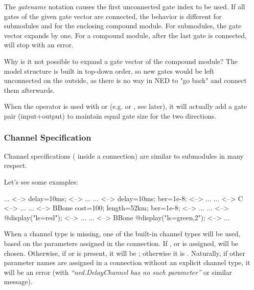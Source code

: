 The \textit{gatename}\ttt{++} notation causes the first unconnected gate index
to be used. If all gates of the given gate vector are connected, the behavior
is different for submodules and for the enclosing compound module.
For submodules, the gate vector expands by one. For a compound module,
after the last gate is connected, \ttt{++} will stop with an error.

\begin{note}
    Why is it not possible to expand a gate vector of the compound
    module? The model structure is built in top-down order, so new gates
    would be left unconnected on the outside, as there is no way in NED to
    "go back" and connect them afterwards.
\end{note}

When the \ttt{++} operator is used with  or 
(e.g.  or , see later), it will actually add
a gate pair (input+output) to maintain equal gate size for the two
directions.



\subsubsection{Channel Specification}

Channel specifications ( inside a connection)
are similar to submodules in many respect.

Let's see some examples:

\begin{ned}
... <--> {delay=10ms;} <--> ...
... <--> {delay=10ms; ber=1e-8;} <--> ...
... <--> C <--> ...
... <--> BBone {cost=100; length=52km; ber=1e-8;} <--> ...
... <--> {@display("ls=red");} <--> ...
... <--> BBone {@display("ls=green,2");} <--> ...
\end{ned}


When a channel type is missing, one of the built-in channel types will be
used, based on the parameters assigned in the connection. If
,  or  is assigned,
 will be chosen. Otherwise, if  or
 is present, it will be ; otherwise it
is . Naturally, if other parameter names are
assigned in a connection without an explicit channel type, it will be an error
(with \textit{``ned.DelayChannel has no such parameter''} or similar message).


